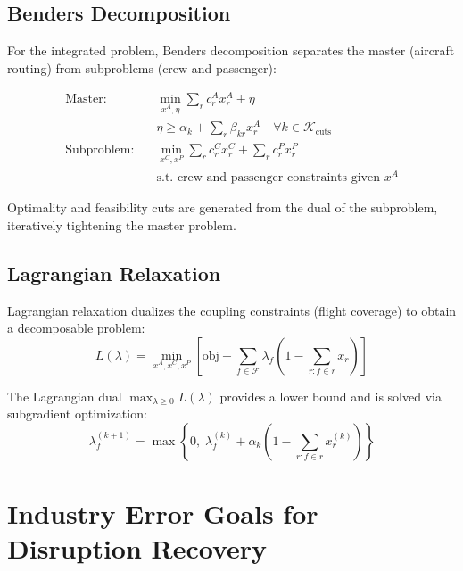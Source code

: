 \documentclass[11pt,a4paper]{book}
\theoremstyle{definition}
\begin{document}
\subsection{Benders Decomposition}

For the integrated problem, Benders decomposition separates the master
(aircraft routing) from subproblems (crew and passenger):

\begin{align}
  \text{Master:} \quad & \min_{x^A, \eta} \sum_r c_r^A x_r^A + \eta \\
  & \eta \geq \alpha_k + \sum_r \beta_{kr} x_r^A
    \quad \forall k \in \mathcal{K}_{\text{cuts}} \\
  \text{Subproblem:} \quad & \min_{x^C, x^P} \sum_r c_r^C x_r^C + \sum_r c_r^P x_r^P \\
  & \text{s.t. crew and passenger constraints given } x^A
\end{align}

Optimality and feasibility cuts are generated from the dual of the
subproblem, iteratively tightening the master problem.

\subsection{Lagrangian Relaxation}

Lagrangian relaxation dualizes the coupling constraints (flight coverage)
to obtain a decomposable problem:
\begin{equation}
  L(\lambda) = \min_{x^A, x^C, x^P} \left[
    \text{obj} + \sum_{f \in \mathcal{F}} \lambda_f
    \left(1 - \sum_{r: f \in r} x_r\right)
  \right]
  \label{eq:lagrangian}
\end{equation}

The Lagrangian dual $\max_{\lambda \geq 0} L(\lambda)$ provides a lower
bound and is solved via subgradient optimization:
\begin{equation}
  \lambda_f^{(k+1)} = \max\left\{0, \;\lambda_f^{(k)}
    + \alpha_k \left(1 - \sum_{r: f \in r} x_r^{(k)}\right)\right\}
\end{equation}

\section{Industry Error Goals for Disruption Recovery}
\end{document}
